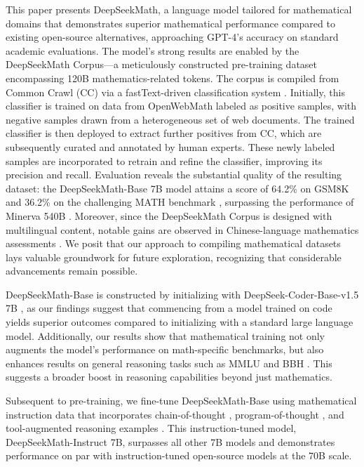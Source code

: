 This paper presents DeepSeekMath, a language model tailored for mathematical domains that demonstrates superior mathematical performance compared to existing open-source alternatives, approaching GPT-4's accuracy on standard academic evaluations. The model’s strong results are enabled by the DeepSeekMath Corpus—a meticulously constructed pre-training dataset encompassing 120B mathematics-related tokens. The corpus is compiled from Common Crawl (CC) via a fastText-driven classification system \citep{joulin2016fasttext}. Initially, this classifier is trained on data from OpenWebMath \citep{openwebmath} labeled as positive samples, with negative samples drawn from a heterogeneous set of web documents. The trained classifier is then deployed to extract further positives from CC, which are subsequently curated and annotated by human experts. These newly labeled samples are incorporated to retrain and refine the classifier, improving its precision and recall. Evaluation reveals the substantial quality of the resulting dataset: the DeepSeekMath-Base 7B model attains a score of 64.2\% on GSM8K \citep{gsm8k} and 36.2\% on the challenging MATH benchmark \citep{MATH}, surpassing the performance of Minerva 540B \citep{minerva}. Moreover, since the DeepSeekMath Corpus is designed with multilingual content, notable gains are observed in Chinese-language mathematics assessments \citep{wei2023cmath,agieval}. We posit that our approach to compiling mathematical datasets lays valuable groundwork for future exploration, recognizing that considerable advancements remain possible.

DeepSeekMath-Base is constructed by initializing with DeepSeek-Coder-Base-v1.5 7B \citep{deepseek-coder}, as our findings suggest that commencing from a model trained on code yields superior outcomes compared to initializing with a standard large language model. Additionally, our results show that mathematical training not only augments the model’s performance on math-specific benchmarks, but also enhances results on general reasoning tasks such as MMLU \citep{mmlu} and BBH \citep{bbh}. This suggests a broader boost in reasoning capabilities beyond just mathematics.

Subsequent to pre-training, we fine-tune DeepSeekMath-Base using mathematical instruction data that incorporates chain-of-thought \citep{cot}, program-of-thought \citep{pot,pal}, and tool-augmented reasoning examples \citep{tora}. This instruction-tuned model, DeepSeekMath-Instruct 7B, surpasses all other 7B models and demonstrates performance on par with instruction-tuned open-source models at the 70B scale.

